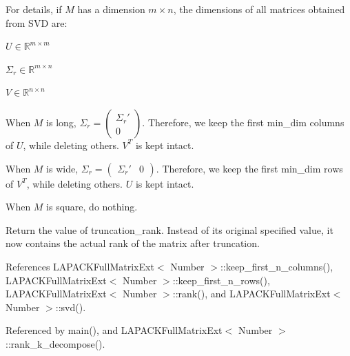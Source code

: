 \begin{DoxyDescription}
For details, if $M$ has a dimension $m \times n$, the dimensions of all matrices obtained from S\+VD are\+:
\begin{DoxyItemize}
\item $U \in \mathbb{R}^{m \times m}$
\item $\Sigma_r \in \mathbb{R}^{m \times n}$
\item $V \in \mathbb{R}^{n \times n}$
\end{DoxyItemize}

When $M$ is long, $\Sigma_r = \begin{pmatrix}\Sigma_r' \\ 0 \end{pmatrix}$. Therefore, we keep the first {\ttfamily min\+\_\+dim} columns of $U$, while deleting others. $V^T$ is kept intact.

When $M$ is wide, $\Sigma_r = \begin{pmatrix} \Sigma_r' & 0 \end{pmatrix}$. Therefore, we keep the first {\ttfamily min\+\_\+dim} rows of $V^T$, while deleting others. $U$ is kept intact.

When $M$ is square, do nothing.

Return the value of {\ttfamily truncation\+\_\+rank}. Instead of its original specified value, it now contains the actual rank of the matrix after truncation.


\end{DoxyDescription}

References L\+A\+P\+A\+C\+K\+Full\+Matrix\+Ext$<$ Number $>$\+::keep\+\_\+first\+\_\+n\+\_\+columns(), L\+A\+P\+A\+C\+K\+Full\+Matrix\+Ext$<$ Number $>$\+::keep\+\_\+first\+\_\+n\+\_\+rows(), L\+A\+P\+A\+C\+K\+Full\+Matrix\+Ext$<$ Number $>$\+::rank(), and L\+A\+P\+A\+C\+K\+Full\+Matrix\+Ext$<$ Number $>$\+::svd().



Referenced by main(), and L\+A\+P\+A\+C\+K\+Full\+Matrix\+Ext$<$ Number $>$\+::rank\+\_\+k\+\_\+decompose().

\mbox{\label{classLAPACKFullMatrixExt_a355ed6360b21081b6e86e09833bf95db}} 
